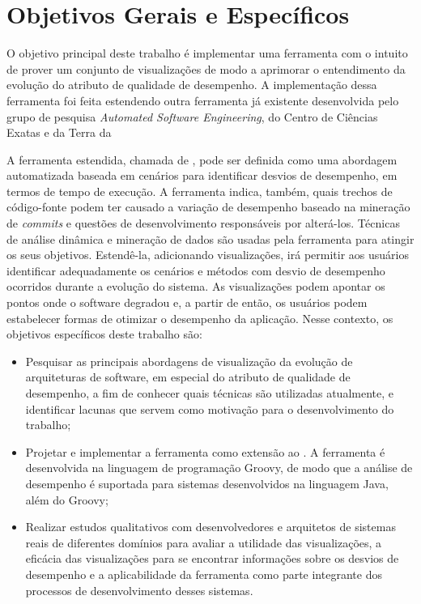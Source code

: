 \section{Objetivos Gerais e Específicos} \label{sec:objetivos-gerais-especificos}

O objetivo principal deste trabalho é implementar uma ferramenta com o intuito de prover um conjunto de visualizações de modo a aprimorar o entendimento da evolução do atributo de qualidade de desempenho. A implementação dessa ferramenta foi feita estendendo outra ferramenta já existente desenvolvida pelo grupo de pesquisa \textit{Automated Software Engineering}, do Centro de Ciências Exatas e da Terra da 

A ferramenta estendida, chamada de \textit{\perfMinerName} \cite{Pinto2015}, pode ser definida como uma abordagem automatizada baseada em cenários para identificar desvios de desempenho, em termos de tempo de execução. A ferramenta indica, também, quais trechos de código-fonte podem ter causado a variação de desempenho baseado na mineração de \textit{commits} e questões de desenvolvimento responsáveis por alterá-los. Técnicas de análise dinâmica e mineração de dados são usadas pela ferramenta para atingir os seus objetivos. Estendê-la, adicionando visualizações, irá permitir aos usuários identificar adequadamente os cenários e métodos com desvio de desempenho ocorridos durante a evolução do sistema. As visualizações podem apontar os pontos onde o software degradou e, a partir de então, os usuários podem estabelecer formas de otimizar o desempenho da aplicação. Nesse contexto, os objetivos específicos deste trabalho são:
\begin{itemize}
	\item Pesquisar as principais abordagens de visualização da evolução de arquiteturas de software, em especial do atributo de qualidade de desempenho, a fim de conhecer quais técnicas são utilizadas atualmente, e identificar lacunas que servem como motivação para o desenvolvimento do trabalho;
	\item Projetar e implementar a ferramenta \textit{{\toolName}} como extensão ao \textit{\perfMinerName}. A ferramenta é desenvolvida na linguagem de programação Groovy, de modo que a análise de desempenho é suportada para sistemas desenvolvidos na linguagem Java, além do Groovy;
	\item Realizar estudos qualitativos com desenvolvedores e arquitetos de sistemas reais de diferentes domínios para avaliar a utilidade das visualizações, a eficácia das visualizações para se encontrar informações sobre os desvios de desempenho e a aplicabilidade da ferramenta como parte integrante dos processos de desenvolvimento desses sistemas.
\end{itemize}

